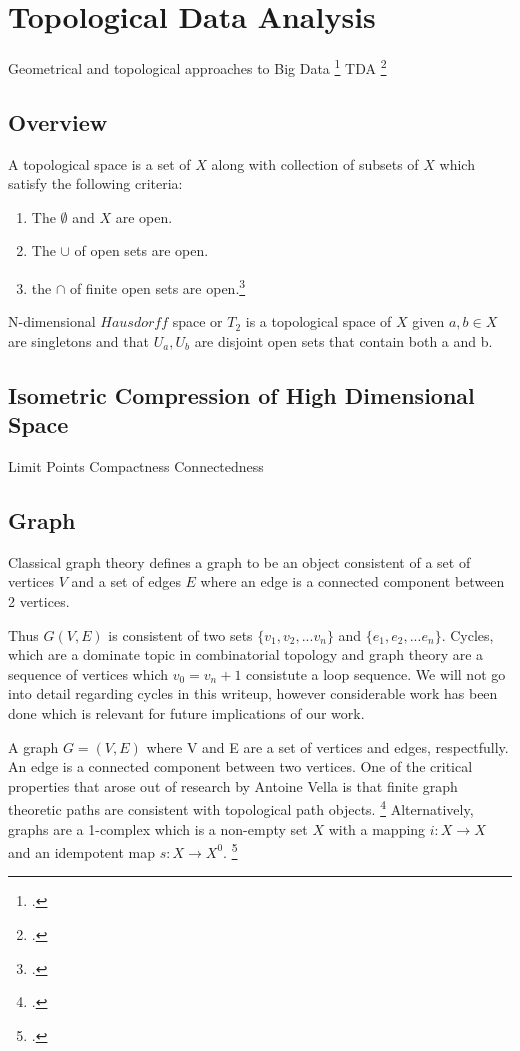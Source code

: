 \section{Topological Data Analysis}
Geometrical and topological approaches to Big Data \footcite{Leonard2016}
TDA \footcite{Wasserman2016}

\subsection{Overview}

\begin{definition}
A topological space is a set of $X$ along with collection of subsets of $X$ which satisfy the following criteria:
\begin{enumerate}
\item The $\emptyset$ and $X$ are open.
\item The $\cup$ of open sets are open.
\item the $\cap$ of finite open sets are open.\footcite{Childs2016}
\end{enumerate}
\end{definition}
N-dimensional $Hausdorff$ space or $T_2$ is a topological space of $X$ given $a,b \in X$ are singletons and that $U_a, U_b$ are disjoint open sets that contain both a and b.

\subsection{Isometric Compression of High Dimensional Space}
Limit Points
Compactness
Connectedness

\subsection{Graph}
Classical graph theory defines a graph to be an object consistent of a set of vertices $V$ and a set of edges $E$ where an edge is a connected component between 2 vertices.

Thus $G(V,E)$ is consistent of two sets $\{v_1, v_2, ... v_n\}$ and $\{e_1, e_2,...e_n\}$. Cycles, which are a dominate topic in combinatorial topology and graph theory are a sequence of vertices which $v_0 = v_n+1$ consistute a loop sequence. We will not go into detail regarding cycles in this writeup, however considerable work has been done which is relevant for future implications of our work.    

\begin{definition}
A graph $G=(V,E)$ where V and E are a set of vertices and edges, respectfully. An edge is a connected component between two vertices. One of the critical properties that arose out of research by Antoine Vella is that finite graph theoretic paths are consistent with topological path objects. \footcite{Vella2015}  Alternatively, graphs are a 1-complex which is a non-empty set $X$ with a mapping $i:X \rightarrow X$ and an idempotent map $s: X \rightarrow X^0$. \footcite{Everitt2018}
\end{definition}

